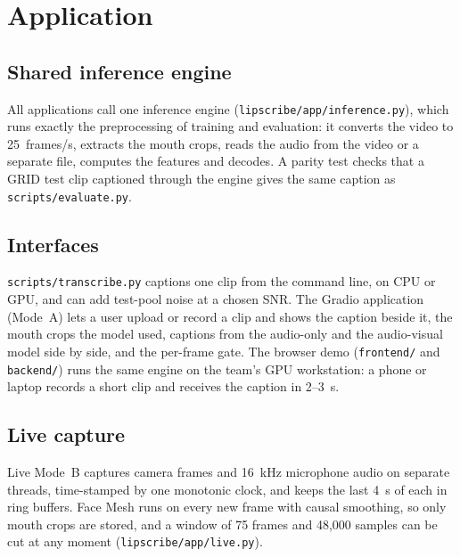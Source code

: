 \section{Application}
\label{sec:application}

\subsection{Shared inference engine}
All applications call one inference engine (\texttt{lipscribe/\allowbreak{}app/\allowbreak{}inference.py}), which runs
exactly the preprocessing of training and evaluation: it converts the video to 25~frames/s,
extracts the mouth crops, reads the audio from the video or a separate file, computes the
features and decodes. A parity test checks that a GRID test clip captioned through the engine
gives the same caption as \texttt{scripts/\allowbreak{}evaluate.py}.

\subsection{Interfaces}
\texttt{scripts/\allowbreak{}transcribe.py} captions one clip from the command line, on CPU or GPU, and can
add test-pool noise at a chosen SNR. The Gradio application (Mode~A) lets a user upload or
record a clip and shows the caption beside it, the mouth crops the model used, captions from
the audio-only and the audio-visual model side by side, and the per-frame gate. The browser
demo (\texttt{frontend/} and \texttt{backend/}) runs the same engine on the team's GPU workstation: a phone or laptop
records a short clip and receives the caption in 2--3~s.

\subsection{Live capture}
Live Mode~B captures camera frames and 16~kHz microphone audio on separate threads, time-stamped
by one monotonic clock, and keeps the last 4~s of each in ring buffers. Face Mesh runs on every
new frame with causal smoothing, so only mouth crops are stored, and a window of 75 frames and
48,000 samples can be cut at any moment (\texttt{lipscribe/\allowbreak{}app/\allowbreak{}live.py}).
